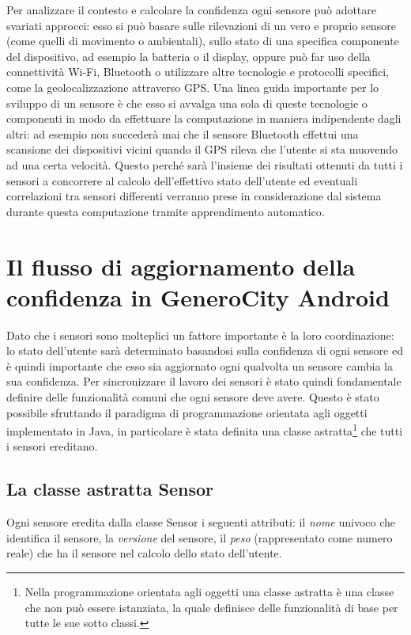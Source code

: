 Per analizzare il contesto e calcolare la confidenza ogni sensore può adottare svariati approcci: esso si può basare sulle rilevazioni di un vero e proprio sensore (come quelli di movimento o ambientali), sullo stato di una specifica componente del dispositivo, ad esempio la batteria o il display, oppure può far uso della connettività Wi-Fi, Bluetooth o utilizzare altre tecnologie e protocolli specifici, come la geolocalizzazione attraverso GPS. Una linea guida importante per lo sviluppo di un sensore è che esso si avvalga una sola di queste tecnologie o componenti in modo da effettuare la computazione in maniera indipendente dagli altri: ad esempio non succederà mai che il sensore Bluetooth effettui una scansione dei dispositivi vicini quando il GPS rileva che l'utente si sta muovendo ad una certa velocità. Questo perché sarà l'insieme dei risultati ottenuti da tutti i sensori a concorrere al calcolo dell'effettivo stato dell'utente ed eventuali correlazioni tra sensori differenti verranno prese in considerazione dal sistema durante questa computazione tramite apprendimento automatico.


\section{Il flusso di aggiornamento della confidenza in GeneroCity Android}
Dato che i sensori sono molteplici un fattore importante è la loro coordinazione: lo stato dell'utente sarà determinato basandosi sulla confidenza di ogni sensore ed è quindi importante che esso sia aggiornato ogni qualvolta un sensore cambia la sua confidenza. Per sincronizzare il lavoro dei sensori è stato quindi fondamentale definire delle funzionalità comuni che ogni sensore deve avere. Questo è stato possibile sfruttando il paradigma di programmazione orientata agli oggetti implementato in Java\cite{ref:Java}, in particolare è stata definita una classe astratta\footnote{Nella programmazione orientata agli oggetti una classe astratta è una classe che non può essere istanziata, la quale definisce delle funzionalità di base per tutte le sue sotto classi.} che tutti i sensori ereditano.

\subsection{La classe astratta Sensor}
Ogni sensore eredita dalla classe Sensor i seguenti attributi: il \textit{nome} univoco che identifica il sensore, la \textit{versione} del sensore, il \textit{peso} (rappresentato come numero reale) che ha il sensore nel calcolo dello stato dell'utente.

